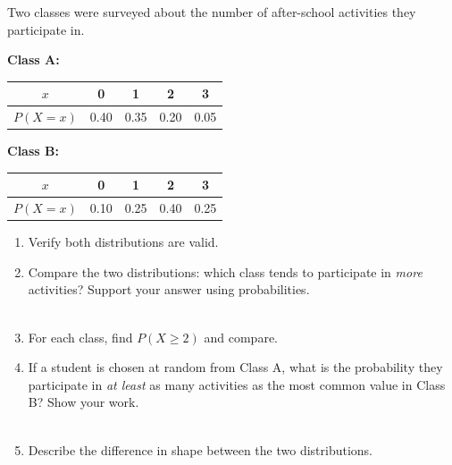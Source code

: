 \documentclass[10pt]{article}
\begin{document}
\begin{tcolorbox}[colback=greenbg!60, colframe=greenacc, title=\textbf{Tier E --- Extension},
    arc=2mm, boxrule=0.8pt, left=4mm, right=4mm, top=3mm, bottom=3mm]
\small
Two classes were surveyed about the number of after-school activities they participate in.

\textbf{Class A:}
\begin{center}
\renewcommand{\arraystretch}{1.3}
\begin{tabular}{@{}ccccc@{}}
$x$ & 0 & 1 & 2 & 3 \\
\hline
$P(X=x)$ & 0.40 & 0.35 & 0.20 & 0.05 \\
\end{tabular}
\end{center}

\textbf{Class B:}
\begin{center}
\renewcommand{\arraystretch}{1.3}
\begin{tabular}{@{}ccccc@{}}
$x$ & 0 & 1 & 2 & 3 \\
\hline
$P(X=x)$ & 0.10 & 0.25 & 0.40 & 0.25 \\
\end{tabular}
\end{center}

\begin{enumerate}[leftmargin=1.5em, itemsep=8pt]
  \item Verify both distributions are valid.

        \vspace{0.2in}

  \item Compare the two distributions: which class tends to participate in \emph{more}
        activities? Support your answer using probabilities.\\
        \writeline\\[1pt]\writeline

  \item For each class, find $P(X \ge 2)$ and compare.

        \vspace{0.25in}

  \item If a student is chosen at random from Class A, what is the probability they
        participate in \emph{at least} as many activities as the most common value in
        Class B? Show your work.\\
        \writeline\\[1pt]\writeline

  \item Describe the difference in shape between the two distributions.\\
        \writeline\\[1pt]\writeline
\end{enumerate}
\end{tcolorbox}
\end{document}
